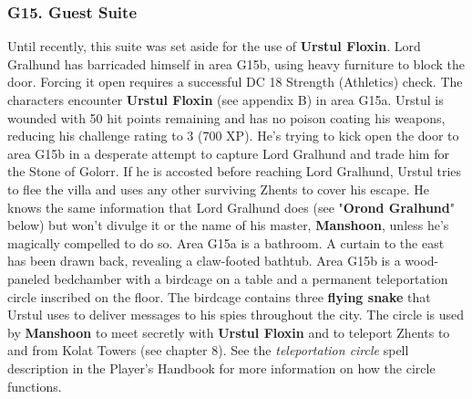 \documentclass[10pt,a4paper,twoside,twocolumn,openany,nodeprecatedcode]{dndbook}
\begin{document}
\subsubsection{G15. Guest Suite}
Until recently, this suite was set aside for the use of \textbf{Urstul Floxin}. Lord Gralhund has barricaded himself in area G15b, using heavy furniture to block the door. Forcing it open requires a successful DC 18 Strength (Athletics) check.
The characters encounter \textbf{Urstul Floxin} (see appendix B) in area G15a. Urstul is wounded with 50 hit points remaining and has no poison coating his weapons, reducing his challenge rating to 3 (700 XP). He's trying to kick open the door to area G15b in a desperate attempt to capture Lord Gralhund and trade him for the Stone of Golorr. If he is accosted before reaching Lord Gralhund, Urstul tries to flee the villa and uses any other surviving Zhents to cover his escape. He knows the same information that Lord Gralhund does (see "\textbf{Orond Gralhund}" below) but won't divulge it or the name of his master, \textbf{Manshoon}, unless he's magically compelled to do so.
Area G15a is a bathroom. A curtain to the east has been drawn back, revealing a claw-footed bathtub.
Area G15b is a wood-paneled bedchamber with a birdcage on a table and a permanent teleportation circle inscribed on the floor. The birdcage contains three \textbf{flying snake} that Urstul uses to deliver messages to his spies throughout the city. The circle is used by \textbf{Manshoon} to meet secretly with \textbf{Urstul Floxin} and to teleport Zhents to and from Kolat Towers (see chapter 8). See the \textit{teleportation circle} spell description in the Player's Handbook for more information on how the circle functions.
\end{document}
